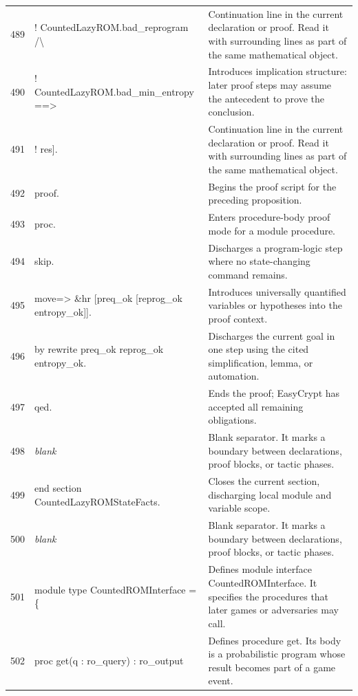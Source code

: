 \documentclass[10pt]{article}
\begin{document}
\begin{longtable}{r L{0.53\textwidth} L{0.37\textwidth}}
489 & {\ttfamily\scriptsize     ! CountedLazyROM.bad\_reprogram /\textbackslash{}} & Continuation line in the current declaration or proof.  Read it with surrounding lines as part of the same mathematical object. \\
490 & {\ttfamily\scriptsize     ! CountedLazyROM.bad\_min\_entropy ==>} & Introduces implication structure: later proof steps may assume the antecedent to prove the conclusion. \\
491 & {\ttfamily\scriptsize     ! res].} & Continuation line in the current declaration or proof.  Read it with surrounding lines as part of the same mathematical object. \\
492 & {\ttfamily\scriptsize proof.} & Begins the proof script for the preceding proposition. \\
493 & {\ttfamily\scriptsize proc.} & Enters procedure-body proof mode for a module procedure. \\
494 & {\ttfamily\scriptsize skip.} & Discharges a program-logic step where no state-changing command remains. \\
495 & {\ttfamily\scriptsize move=> \&hr [preq\_ok [reprog\_ok entropy\_ok]].} & Introduces universally quantified variables or hypotheses into the proof context. \\
496 & {\ttfamily\scriptsize by rewrite preq\_ok reprog\_ok entropy\_ok.} & Discharges the current goal in one step using the cited simplification, lemma, or automation. \\
497 & {\ttfamily\scriptsize qed.} & Ends the proof; EasyCrypt has accepted all remaining obligations. \\
498 & {\ttfamily\scriptsize \emph{blank}} & Blank separator.  It marks a boundary between declarations, proof blocks, or tactic phases. \\
499 & {\ttfamily\scriptsize end section CountedLazyROMStateFacts.} & Closes the current section, discharging local module and variable scope. \\
500 & {\ttfamily\scriptsize \emph{blank}} & Blank separator.  It marks a boundary between declarations, proof blocks, or tactic phases. \\
501 & {\ttfamily\scriptsize module type CountedROMInterface = \{} & Defines module interface CountedROMInterface.  It specifies the procedures that later games or adversaries may call. \\
502 & {\ttfamily\scriptsize   proc get(q : ro\_query) : ro\_output} & Defines procedure get.  Its body is a probabilistic program whose result becomes part of a game event. \\

\end{longtable}
\end{document}
